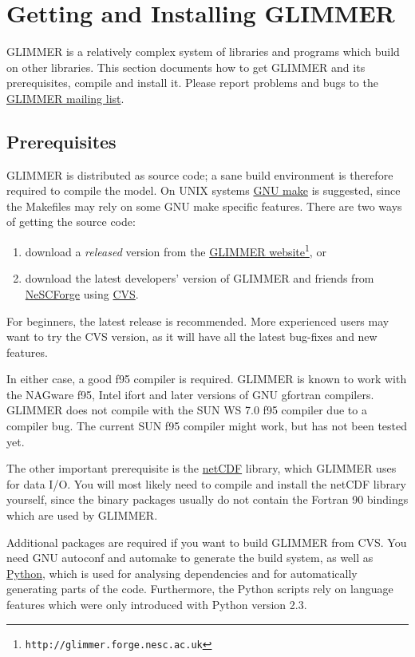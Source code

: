 
\section{Getting and Installing GLIMMER}
GLIMMER is a relatively complex system of libraries and programs which build on other libraries. This section documents how to get GLIMMER and its prerequisites, compile and install it. Please report problems and bugs to the \href{http://forge.nesc.ac.uk/mailman/listinfo/glimmer-discuss}{GLIMMER mailing list}.
%
\subsection{Prerequisites}
GLIMMER is distributed as source code; a sane build environment is therefore required to compile the model. On UNIX systems \href{http://www.gnu.org/software/make/}{GNU make} is suggested, since the Makefiles may rely on some GNU make specific features. There are two ways of getting the source code:
%
\begin{enumerate}
\item download a {\it released} version from the \href{http://glimmer.forge.nesc.ac.uk}{GLIMMER website}\footnote{\texttt{http://glimmer.forge.nesc.ac.uk}}, or
\item download the latest developers' version of GLIMMER and friends from \href{http://forge.nesc.ac.uk/}{NeSCForge} using \href{http://www.gnu.org/software/cvs/}{CVS}.
\end{enumerate}
%
For beginners, the latest release is recommended. More experienced users may want to try the CVS version, as it will have all the latest bug-fixes and new features.

In either case, a good f95 compiler is required. GLIMMER is known to work with the NAGware f95, Intel ifort and later versions of GNU gfortran compilers. GLIMMER does not compile with the SUN WS 7.0 f95 compiler due to a compiler bug. The current SUN f95 compiler might work, but has not been tested yet.

The other important prerequisite is the \href{http://www.unidata.ucar.edu/packages/netcdf/index.html}{netCDF} library, which GLIMMER uses for data I/O. You will most likely need to compile and install the netCDF library yourself, since the binary packages usually do not contain the Fortran 90 bindings which are used by GLIMMER.

Additional packages are required if you want to build GLIMMER from CVS. You need GNU autoconf and automake to generate the build system, as well as \href{http://www.python.org}{Python}, which is used for analysing dependencies and for automatically generating parts of the code. Furthermore, the Python scripts rely on language features which were only introduced with Python version 2.3.
%
